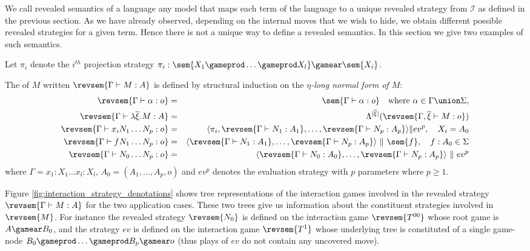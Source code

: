We call revealed semantics of a language any model that maps each term of the language to a unique revealed strategy from $\mathcal{I}$ as defined in the previous section.
As we have already observed, depending on the internal moves that we wish to hide, we obtain different possible revealed strategies for a given term. Hence there is not a unique way to define a revealed semantics. In this section we give two examples of such semantics.

Let $\pi_i$ denote the $i^{th}$ projection strategy $\pi_i : \sem{X_1 \gameprod
\ldots \gameprod X_l} \gamear \sem{X_i}$.

\begin{definition}
\label{dfn:fully_revealed_semantics}
The  of $M$ written $\revsem{\Gamma \vdash M : A}$ is defined by structural induction on the \emph{$\eta$-long normal form of $M$}:
\begin{eqnarray*}
\revsem{\Gamma \vdash \alpha : o} &=&
\sem{\Gamma \vdash \alpha : o} \quad \mbox{where } \alpha \in \Gamma \union \Sigma,\\
\revsem{\Gamma \vdash \lambda \overline{\xi} . M  : A} &=& \Lambda^{|\overline{\xi}|}(\revsem{\Gamma, \overline{\xi} \vdash M : o })  \\
\revsem{\Gamma  \vdash x_i N_1 \ldots N_p :o} &=& \langle \pi_i, \revsem{\Gamma \vdash N_1 : A_1}, \ldots, \revsem{\Gamma \vdash N_p : A_p}  \rangle \| ev^p, \quad X_i = A_0 \\
\revsem{\Gamma \vdash f N_1 \ldots N_p : o} &=& \langle \revsem{\Gamma \vdash N_1 : A_1}, \ldots, \revsem{\Gamma \vdash N_p : A_p} \rangle\ \|\ \sem{f}, \quad f : A_0 \in \Sigma \\
\revsem{\Gamma \vdash N_0 \ldots N_p : o} &=& \langle \revsem{\Gamma \vdash N_0 : A_0}, \ldots, \revsem{\Gamma \vdash N_p : A_p}  \rangle\ \|\ ev^p
\end{eqnarray*}
where $\Gamma = x_1 : X_1 \ldots x_l : X_l$, $A_0 =
(A_1,\ldots,A_p,o)$ and $ev^p$ denotes the evaluation strategy with
$p$ parameters where $p\geq 1$.
\end{definition}

Figure \ref{fig:interaction_strategy_denotations} shows tree representations of the interaction games involved in the revealed strategy $\revsem{\Gamma \vdash M : A}$ for the two application cases. These two trees give us information about the constituent strategies involved in $\revsem{M}$. For instance the revealed strategy $\revsem{N_0}$ is defined on the interaction game $\revsem{T^{00}}$ whose root game is $A \gamear B_0$, and the strategy $ev$ is defined on the interaction game $\revsem{T^1}$ whose underlying tree is constituted of a single game-node $B_0 \gameprod \ldots \gameprod B_p \gamear o$ (thus plays of $ev$ do not contain any uncovered move).


